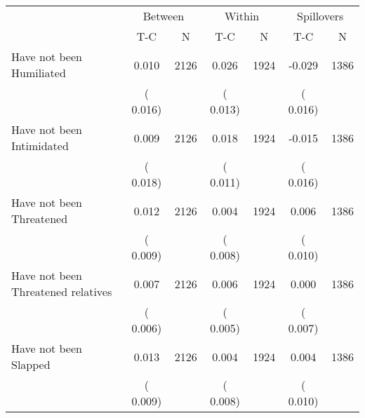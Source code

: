 
\begin{tabular}{l*{6}{c}}\hline&\multicolumn{2}{c}{Between}&\multicolumn{2}{c}{Within}&\multicolumn{2}{c}{Spillovers} \\ \cmidrule(r){2-3}\cmidrule(l){4-5}\cmidrule(l){6-7} & {T-C} & {N} & {T-C} & {N}  & {T-C}  & {N}  \\ \midrule
Have not been Humiliated        &              0.010      &       2126       &              0.026      &       1924       &             -0.029      &       1386       \\
                       &       (       0.016)            &                               &       (       0.013)            &                               &       (       0.016)            &                               \\
Have not been Intimidated        &              0.009      &       2126       &              0.018      &       1924       &             -0.015      &       1386       \\
                       &       (       0.018)            &                               &       (       0.011)            &                               &       (       0.016)            &                               \\
Have not been Threatened        &              0.012      &       2126       &              0.004      &       1924       &              0.006      &       1386       \\
                       &       (       0.009)            &                               &       (       0.008)            &                               &       (       0.010)            &                               \\
Have not been Threatened relatives        &              0.007      &       2126       &              0.006      &       1924       &              0.000      &       1386       \\
                       &       (       0.006)            &                               &       (       0.005)            &                               &       (       0.007)            &                               \\
Have not been Slapped        &              0.013      &       2126       &              0.004      &       1924       &              0.004      &       1386       \\
                       &       (       0.009)            &                               &       (       0.008)            &                               &       (       0.010)            &                               \\

\end{tabular}
